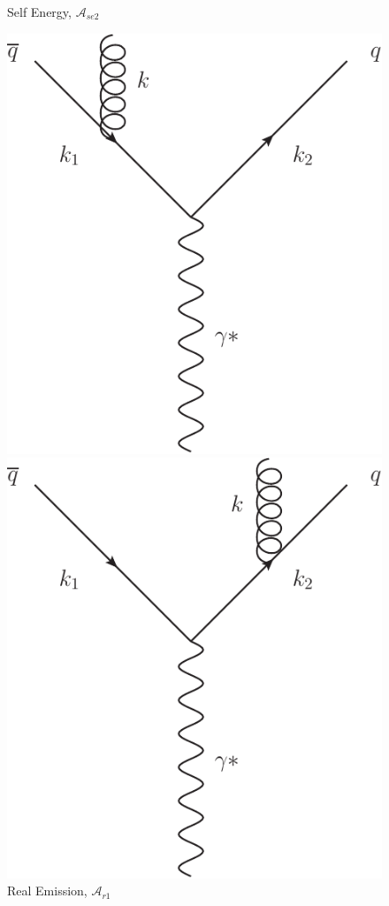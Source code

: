 \begin{figure}[tpb]
\begin{minipage}{0.4\linewidth}
				\caption{Self Energy, $\mathcal{A}_{se2}$}
				\label{fig:NLOfig_4}
			\end{minipage}
			\begin{minipage}{0.4\linewidth}
				\centering
				\includegraphics[width=0.98\linewidth]{NLORealLeft}
				\caption{Real Emission, $\mathcal{A}_{r1}$}
				\label{fig:NLOfig_5}
			\end{minipage}
			\begin{minipage}{0.4\linewidth}
				\centering
				\includegraphics[width=0.98\linewidth]{NLORealRight}

\end{minipage}
\end{figure}
